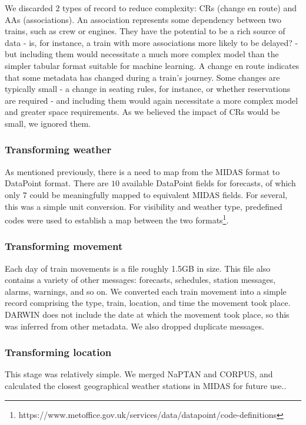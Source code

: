 \documentclass[12pt,a4paper]{article}
\begin{document}
We discarded $2$ types of record to reduce complexity: CRs (change en route) and AAs (associations). An association represents some dependency between two trains, such as crew or engines. They have the potential to be a rich source of data - is, for instance, a train with more associations more likely to be delayed? - but including them would necessitate a much more complex model than the simpler tabular format suitable for machine learning. A change en route indicates that some metadata has changed during a train's journey. Some changes are typically small - a change in seating rules, for instance, or whether reservations are required - and including them would again necessitate a more complex model and greater space requirements. As we believed the impact of CRs would be small, we ignored them.

\subsubsection{Transforming weather}

As mentioned previously, there is a need to map from the MIDAS format to DataPoint format. There are $10$ available DataPoint fields for forecasts, of which only $7$ could be meaningfully mapped to equivalent MIDAS fields. For several, this was a simple unit conversion. For visibility and weather type, predefined codes were used to establish a map between the two formats\footnote{https://www.metoffice.gov.uk/services/data/datapoint/code-definitions}. 

\subsubsection{Transforming movement}

Each day of train movements is a file roughly 1.5GB in size. This file also contains a variety of other messages: forecasts, schedules, station messages, alarms, warnings, and so on. We converted each train movement into a simple record comprising the type, train, location, and time the movement took place. DARWIN does not include the date at which the movement took place, so this was inferred from other metadata. We also dropped duplicate messages.

\subsubsection{Transforming location}

This stage was relatively simple. We merged NaPTAN and CORPUS, and calculated the closest geographical weather stations in MIDAS for future use.. 
\end{document}

